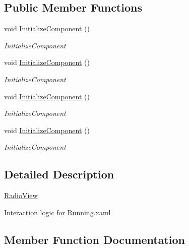 \subsection*{Public Member Functions}
\begin{DoxyCompactItemize}
\item 
void \hyperlink{class_presentation_1_1_view_1_1_radio_view_a1ecaa37c7376879dae58561a0a3266d8}{Initialize\+Component} ()
\begin{DoxyCompactList}\small\item\em Initialize\+Component \end{DoxyCompactList}\item 
void \hyperlink{class_presentation_1_1_view_1_1_radio_view_a1ecaa37c7376879dae58561a0a3266d8}{Initialize\+Component} ()
\begin{DoxyCompactList}\small\item\em Initialize\+Component \end{DoxyCompactList}\item 
void \hyperlink{class_presentation_1_1_view_1_1_radio_view_a1ecaa37c7376879dae58561a0a3266d8}{Initialize\+Component} ()
\begin{DoxyCompactList}\small\item\em Initialize\+Component \end{DoxyCompactList}\item 
void \hyperlink{class_presentation_1_1_view_1_1_radio_view_a1ecaa37c7376879dae58561a0a3266d8}{Initialize\+Component} ()
\begin{DoxyCompactList}\small\item\em Initialize\+Component \end{DoxyCompactList}\end{DoxyCompactItemize}


\subsection{Detailed Description}
\hyperlink{class_presentation_1_1_view_1_1_radio_view}{Radio\+View} 

Interaction logic for Running.\+xaml 

\subsection{Member Function Documentation}
\mbox{\label{class_presentation_1_1_view_1_1_radio_view_a1ecaa37c7376879dae58561a0a3266d8}} 
